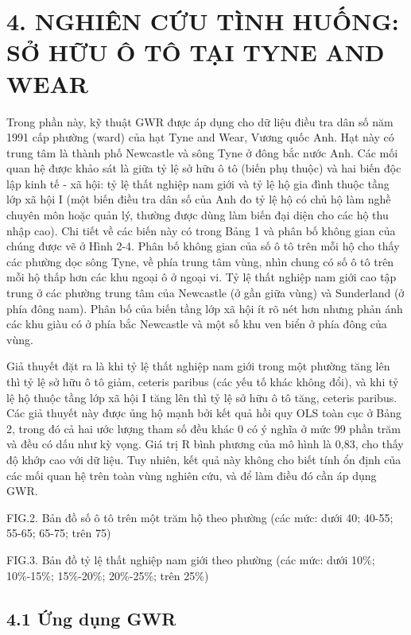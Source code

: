 \section{4. NGHIÊN CỨU TÌNH HUỐNG: SỞ HỮU Ô TÔ TẠI TYNE AND WEAR}

Trong phần này, kỹ thuật GWR được áp dụng cho dữ liệu điều tra dân số năm 1991 cấp phường (ward) của hạt Tyne and Wear, Vương quốc Anh. Hạt này có trung tâm là thành phố Newcastle và sông Tyne ở đông bắc nước Anh. Các mối quan hệ được khảo sát là giữa tỷ lệ sở hữu ô tô (biến phụ thuộc) và hai biến độc lập kinh tế - xã hội: tỷ lệ thất nghiệp nam giới và tỷ lệ hộ gia đình thuộc tầng lớp xã hội I (một biến điều tra dân số của Anh đo tỷ lệ hộ có chủ hộ làm nghề chuyên môn hoặc quản lý, thường được dùng làm biến đại diện cho các hộ thu nhập cao). Chi tiết về các biến này có trong Bảng 1 và phân bố không gian của chúng được vẽ ở Hình 2-4. Phân bố không gian của số ô tô trên mỗi hộ cho thấy các phường dọc sông Tyne, về phía trung tâm vùng, nhìn chung có số ô tô trên mỗi hộ thấp hơn các khu ngoại ô ở ngoại vi. Tỷ lệ thất nghiệp nam giới cao tập trung ở các phường trung tâm của Newcastle (ở gần giữa vùng) và Sunderland (ở phía đông nam). Phân bố của biến tầng lớp xã hội ít rõ nét hơn nhưng phản ánh các khu giàu có ở phía bắc Newcastle và một số khu ven biển ở phía đông của vùng.

Giả thuyết đặt ra là khi tỷ lệ thất nghiệp nam giới trong một phường tăng lên thì tỷ lệ sở hữu ô tô giảm, ceteris paribus (các yếu tố khác không đổi), và khi tỷ lệ hộ thuộc tầng lớp xã hội I tăng lên thì tỷ lệ sở hữu ô tô tăng, ceteris paribus. Các giả thuyết này được ủng hộ mạnh bởi kết quả hồi quy OLS toàn cục ở Bảng 2, trong đó cả hai ước lượng tham số đều khác 0 có ý nghĩa ở mức 99 phần trăm và đều có dấu như kỳ vọng. Giá trị R bình phương của mô hình là 0,83, cho thấy độ khớp cao với dữ liệu. Tuy nhiên, kết quả này không cho biết tính ổn định của các mối quan hệ trên toàn vùng nghiên cứu, và để làm điều đó cần áp dụng GWR.

FIG.2. Bản đồ số ô tô trên một trăm hộ theo phường (các mức: dưới 40; 40-55; 55-65; 65-75; trên 75)

FIG.3. Bản đồ tỷ lệ thất nghiệp nam giới theo phường (các mức: dưới 10\%; 10\%-15\%; 15\%-20\%; 20\%-25\%; trên 25\%)

\subsection{4.1 Ứng dụng GWR}

